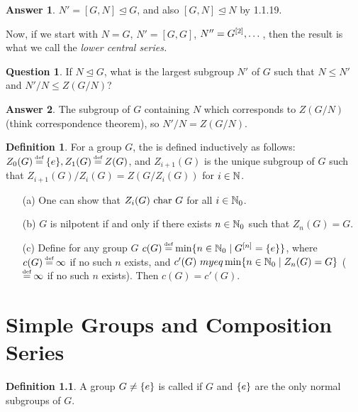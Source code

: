 \documentclass[11pt]{book}
\newcounter{counter}
\theoremstyle{definition}   \newtheorem{defn}[counter]{Definition} %
\newtheorem*{question}{Question}   \newtheorem*{answer}{Answer}   \newtheorem{modification}[counter]{Modification}   \newtheorem{numitem}[counter]{}
\newcommand{\nsg}{\mathrel{\unlhd}}   \newcommand{\ind}{\parindent24pt}   \newcommand{\vn}{\varnothing}
\newcommand\myeq{\mathrel{\overset{\makebox[0pt]{\mbox{\normalfont\tiny\sffamily \textrm{def}}}}{=}}}
\newcommand{\vs}{\vspace{8pt}}
\numberwithin{counter}{chapter}
\begin{document}
\begin{answer}
$N' = [G,N] \nsg G$, and also $[G,N] \nsg N$ by 1.1.19.
\end{answer}

\vs

Now, if we start with $N=G$, $N' = [G,G]$, $N'' = G^{[2]}, \dots$, then the result is what we call the \textit{lower central series.}

\vs

\begin{question}
If $N \nsg G$, what is the largest subgroup $N'$ of $G$ such that $N \leq N'$ and $N'/N \leq Z(G/N)$?
\end{question}

\begin{answer}
The subgroup of $G$ containing $N$ which corresponds to $Z(G/N)$ (think correspondence theorem), so $N'/N = Z(G/N)$.
\end{answer}

\vs

\begin{defn}
For a group $G$, the  is defined inductively as follows: $Z_0(G) \myeq \triv, Z_1(G) \myeq Z(G)$, and $Z_{i+1}(G)$ is the unique subgroup of $G$ such that  $Z_{i+1}(G)/Z_i(G) = Z(G/Z_i(G))$ for $i \in \operatorname{\mathbb{N}}$.
\end{defn}

\vs

\begin{remark}
\begin{enumerate}\
\item[(a)] One can show that $Z_i(G) \textnormal{ char } G$ for all $i \in \operatorname{\mathbb{N}}_0$.
\item[(b)] $G$ is nilpotent if and only if there exists $n \in \operatorname{\mathbb{N}}_0$ such that $Z_n(G) = G$.
\item[(c)] Define for any group $G$ $c(G) \myeq \min \{n \in \N_0 \mid \lcs{G}{n} = \triv \}$, where $c(G) \myeq \infty$ if no such $n$ exists, and $c'(G) \
myeq \min\{n \in \operatorname{\mathbb{N}}_0 \mid Z_n(G) = G\}$ ($\myeq \infty$ if no such $n$ exists). Then $c(G) = c'(G)$.
\end{enumerate}
\end{remark}



\chapter{Simple Groups and Composition Series}

\begin{defn}
A group $G \ne \{e\}$ is called  if $G$ and $\{e\}$ are the only normal subgroups of $G$.
\end{defn}
\end{document}
